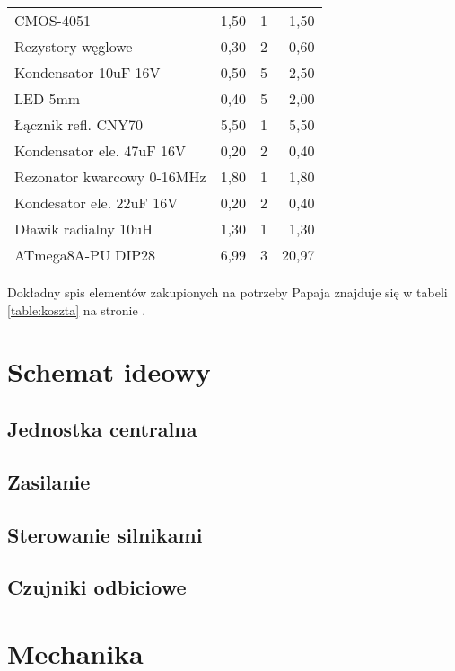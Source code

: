 \documentclass{article}
\begin{document}
\begin{table}[c]
\begin{tabular}{l|r|r|r}
CMOS-4051                     & 1,50        & 1     & 1,50         \\
Rezystory węglowe             & 0,30        & 2     & 0,60         \\
Kondensator 10uF 16V          & 0,50        & 5     & 2,50         \\
LED 5mm                       & 0,40        & 5     & 2,00         \\
Łącznik refl. CNY70           & 5,50        & 1     & 5,50         \\
Kondensator ele. 47uF 16V     & 0,20        & 2     & 0,40         \\
Rezonator kwarcowy 0-16MHz    & 1,80        & 1     & 1,80         \\
Kondesator ele. 22uF 16V      & 0,20        & 2     & 0,40         \\
Dławik radialny 10uH          & 1,30        & 1     & 1,30         \\
ATmega8A-PU DIP28             & 6,99        & 3     & 20,97        
\end{tabular}
\end{table}

Dokładny spis elementów zakupionych na potrzeby Papaja znajduje się w tabeli \ref{table:koszta} na stronie \pageref{table:koszta}.

\section{Schemat ideowy}

\subsection{Jednostka centralna}


\subsection{Zasilanie}

\subsection{Sterowanie silnikami}

\subsection{Czujniki odbiciowe}

\section{Mechanika}
\end{document}
